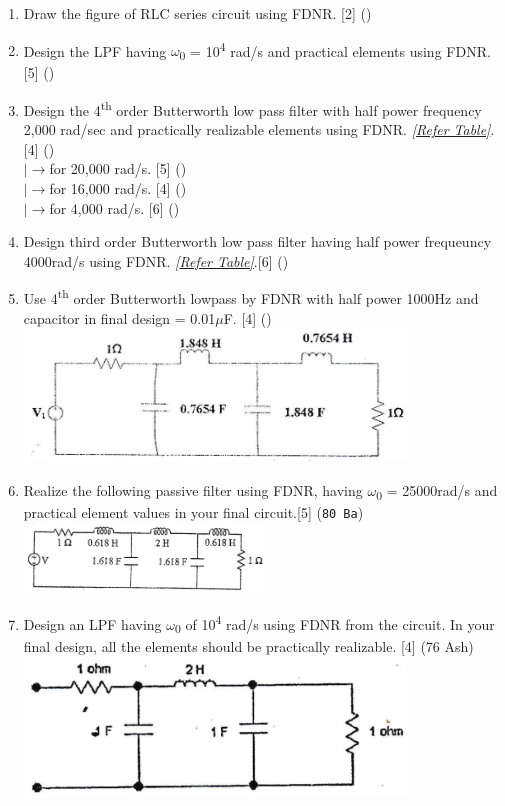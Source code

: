 \documentclass[12pt]{article}
\newcommand{\w}{\(\omega\)}
\newcommand{\lb}{\\$\left|\rightarrow\right.$}
\newcommand{\sub}[1]{\textsubscript{#1}}
\newcommand{\super}[1]{\textsuperscript{#1}}
\begin{document}
\begin{enumerate}
				\item Draw the figure of RLC series circuit using FDNR. \hfill [2] ()

				\item Design the LPF having \w\sub{0} = 10\super{4} rad/s and practical elements using FDNR. \hfill [5] ()

				\item Design the 4\super{th} order Butterworth low pass filter with half power frequency 2,000 rad/sec and practically realizable elements using FDNR. \textit{[\hyperref[sec:tables_81bh]{Refer Table]}}. \hfill [4] ()
				\lb for 20,000 rad/s. \hfill [5] ()
				\lb for 16,000 rad/s. \hfill [4] ()
				\lb for 4,000 rad/s. \hfill [6] ()

				\item Design third order Butterworth low pass filter having half power frequeuncy 4000rad/s using FDNR. \textit{[\hyperref[sec:tables_81bh]{Refer Table]}}.\hfill [6] ()

				\item Use 4\super{th} order Butterworth lowpass by FDNR with half power 1000Hz and capacitor in final design = 0.01$\mu$F. \hfill [4] ()\\
				\includegraphics[width=4in]{./pics/fd_13}

				\item Realize the following passive filter using FDNR, having \w\sub{0} = 25000rad/s and practical element values in your final circuit.\hfill[5] (\texttt{80 Ba})\\
				\includegraphics[width=0.5\textwidth]{./pics/fd_4}

				\item Design an LPF having \w\sub{0} of 10\super{4} rad/s using FDNR from the circuit. In your final design, all the elements should be practically realizable. \hfill [4] (76 Ash)\\
				\includegraphics[width=4in]{./pics/fd_7}


\end{enumerate}
\end{document}
